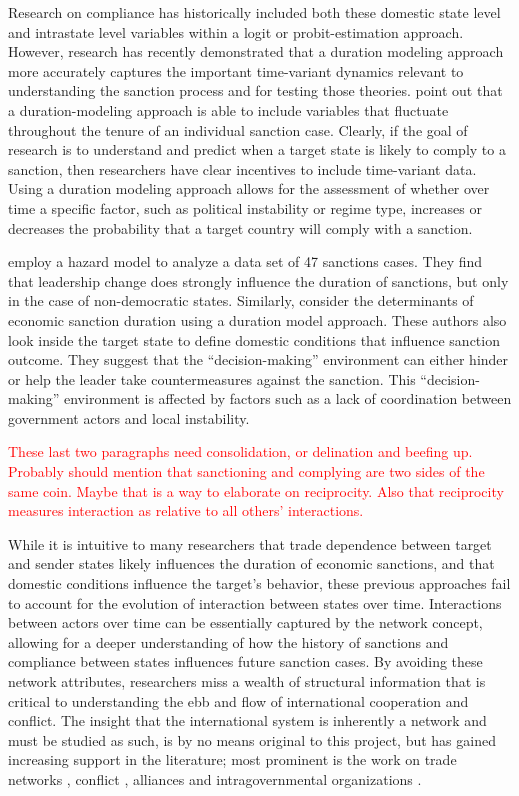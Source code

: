 Research on compliance has historically included both these domestic state level and intrastate level variables within a logit or probit-estimation approach. However, research has recently demonstrated that a duration modeling approach more accurately captures the important time-variant dynamics relevant to understanding the sanction process and for testing those theories. \cite{bolks2000} point out that a duration-modeling approach is able to include variables that fluctuate throughout the tenure of an individual sanction case. Clearly, if the goal of research is to understand and predict when a target state is likely to comply to a sanction, then researchers have clear incentives to include time-variant data. Using a duration modeling approach allows for the assessment of whether over time a specific factor, such as political instability or regime type, increases or decreases the probability that a target country will comply with a sanction.

\cite{mcgillivray2004} employ a hazard model to analyze a data set of 47 sanctions cases. They find that leadership change does strongly influence the duration of sanctions, but only in the case of non-democratic states. Similarly, \cite{bolks2000} consider the determinants of economic sanction duration using a duration model approach. These authors also look inside the target state to define domestic conditions that influence sanction outcome. They suggest that the ``decision-making'' environment can either hinder or help the leader take countermeasures against the sanction. This ``decision-making'' environment is affected by factors such as a lack of coordination between government actors and local instability. 

\textcolor{red}{These last two paragraphs need consolidation, or delination and beefing up. Probably should mention that sanctioning and complying are two sides of the same coin. Maybe that is a way to elaborate on reciprocity. Also that reciprocity measures interaction as relative to all others' interactions.}

While it is intuitive to many researchers that trade dependence between target and sender states likely influences the duration of economic sanctions, and that domestic conditions influence the target's behavior, these previous approaches fail to account for the evolution of interaction between states over time. Interactions between actors over time can be essentially captured by the network concept, allowing for a deeper understanding of how the history of sanctions and compliance between states influences future sanction cases. By avoiding these network attributes, researchers miss a wealth of structural information that is critical to understanding the ebb and flow of international cooperation and conflict. The insight that the international system is inherently a network and must be studied as such, is by no means original to this project, but has gained increasing support in the literature; most prominent is the work on trade networks \citep{hoff2004modeling} , conflict \citep{dorff2013}, alliances \citep{warren2010geometry} and intragovernmental organizations \citep{cao2009networks,greenhill2010norm}. 

